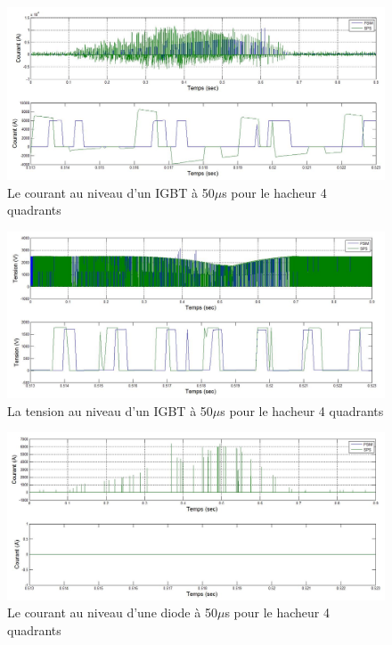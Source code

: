 \documentclass[11pt,letterpaper,final]{report}
\begin{document}
\begin{figure}[htb]
\centering
\includegraphics[scale=0.5]{Fig/DCP_AFE/50u/hash_cou_IGBT.jpg}
\caption{Le courant au niveau d'un IGBT à 50$\mu$s pour le hacheur 4 quadrants}
\label{AF_DC_HAA50}
\end{figure}

\begin{figure}[htb]
\centering
\includegraphics[scale=0.5]{Fig/DCP_AFE/50u/hash_ten_IGBT.jpg}
\caption{La tension au niveau d'un IGBT à 50$\mu$s pour le hacheur 4 quadrants}
\label{AF_DC_HAV50}
\end{figure}


\begin{figure}[htb]
\centering
\includegraphics[scale=0.5]{Fig/DCP_AFE/50u/hash_diode_cou.jpg}
\caption{Le courant au niveau d'une diode à 50$\mu$s pour le hacheur 4 quadrants}
\label{AF_DC_HA50}
\end{figure}
\end{document}
